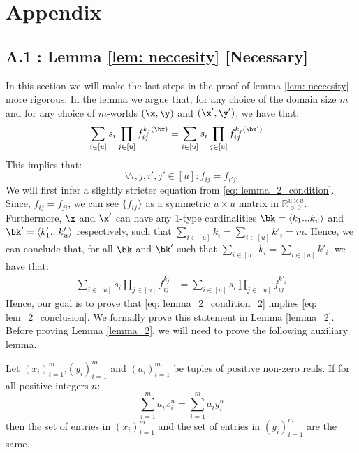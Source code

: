 \section*{Appendix}
\subsection*{ A.1 : Lemma \ref{lem: neccesity} [Necessary]}
In this section we will make the last steps in the proof of lemma \ref{lem: neccesity} more rigorous. In the lemma we argue that, for any choice of the domain size $m$ and for any choice of $m$-worlds $(\x,\y)$ and $(\x',\y')$, we have that:
  \begin{align}
    \label{eq: lemma_2_condition}
    \sum_{i\in [u]}s_i \prod_{j\in[u]}f_{ij}^{k_{j}(\bx)} &= \sum_{i\in [u]}s_i \prod_{j\in[u]}f_{ij}^{k_{j}(\bx')} 
  \end{align}
This implies that:
\begin{equation}
    \label{eq: lem_2_conclusion}
      \forall i,j,i',j'\in [u]: f_{ij} =  f_{i'j'}  
\end{equation}
We will first infer a slightly stricter equation from \eqref{eq: lemma_2_condition}.
Since, $f_{ij} = f_{ji}$, we can see $\{f_{ij}\}$ as a symmetric $u \times u$ matrix in $\mathbb{R}_{>0}^{u\times u}$. Furthermore, $\x$ and $\x'$ can have any
1-type cardinalities $\bk = \langle k_1 ... k_u\rangle$ and $\bk'= \langle k'_1 ... k'_u\rangle$ respectively, such that $\sum_{i\in [u]}k_i = \sum_{i\in [u]}k'_i = m$. Hence, we can conclude that, for all $\bk$ and $ \bk'$ such that $\sum_{i\in [u]}k_i = \sum_{i\in [u]}k'_i$, we have that:
\begin{align}
    \label{eq: lemma_2_condition_2}
    \sum_{i\in [u]}s_i \prod_{j\in[u]}f_{ij}^{k_j} &= \sum_{i\in [u]}s_i \prod_{j\in[u]}f_{ij}^{k'_{j}} 
  \end{align}
Hence, our goal is to prove that \eqref{eq: lemma_2_condition_2} implies \eqref{eq: lem_2_conclusion}. We formally prove this statement in Lemma \ref{lemma_2}. Before proving Lemma \ref{lemma_2}, we will need to prove the following 
auxiliary lemma. 
\begin{lemma}
    \label{lemma_1}
  Let $(x_i)^{m}_{i=1}$,$(y_i)^{m}_{i=1}$ and $(a_i)^{m}_{i=1}$ be tuples of positive non-zero reals. If for all positive integers $n$: 
    \begin{equation}
      \label{eq: lemma_1}
     \sum_{i=1}^{m}a_ix_i^{n} = \sum_{i=1}^{m}a_iy_i^{n}
    \end{equation}
  then the set of entries in $(x_i)^{m}_{i=1}$ and the set of entries in $(y_i)^{m}_{i=1}$ are the same. 
  \end{lemma}
    
